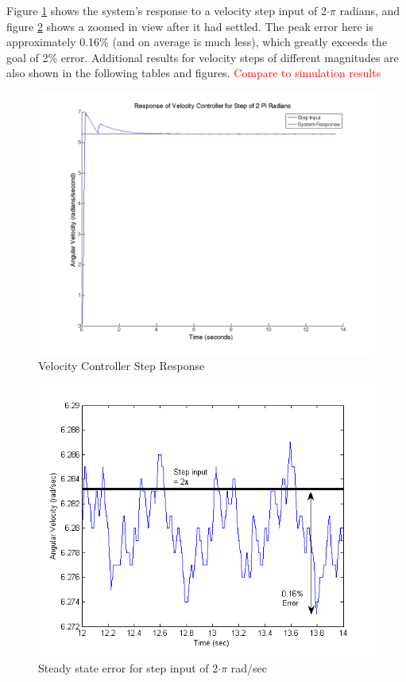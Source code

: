 \documentclass{article}
\newcommand{\xxx}[1]{\textcolor{red}{#1}}
\theoremstyle{plain}
\theoremstyle{definition}
\theoremstyle{remark}
\begin{document}
Figure \ref{q6_4} shows the system's response to a velocity step input of 2$\cdot\pi$ radians, and figure \ref{VelStepError} shows a zoomed in view after it had settled. The peak error here is approximately 0.16\% (and on average is much less), which greatly exceeds the goal of 2\% error. Additional results for velocity steps of different magnitudes are also shown in the following tables and figures.
\xxx{Compare to simulation results}

\begin{figure}
\begin{center}
\includegraphics[width = 12cm]{velstep2Pi.png}
\caption{Velocity Controller Step Response}
\label{q6_4}
\end{center}
\end{figure}

\begin{figure}
\begin{center}
\includegraphics[width = 12cm]{VelStepError.png}
\caption{Steady state error for step input of 2$\cdot\pi$ rad/sec}
\label{VelStepError}
\end{center}
\end{figure}
\end{document}
